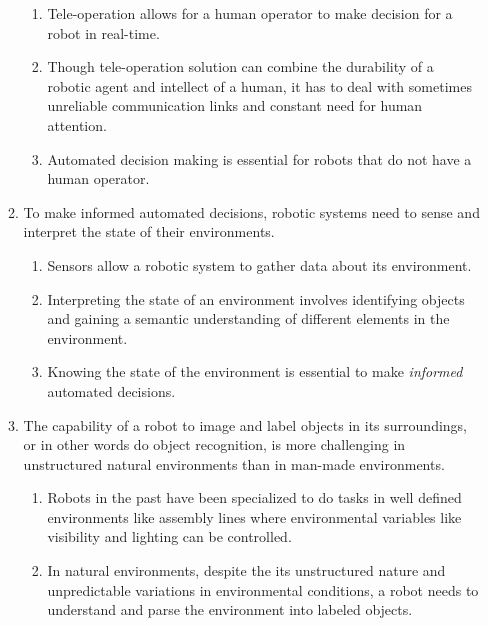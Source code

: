 \documentclass {udthesis}
\begin{document}
\begin{enumerate}[label=Chapter \arabic*:]
\begin{enumerate}[label=Section \arabic*:, start=0]
\begin{enumerate}[label=Para \arabic*:, start=1]
      \item Tele-operation allows for a human operator to make decision for a robot in real-time.
      
      \item Though tele-operation solution can combine the durability of a robotic agent and intellect of a human, it has to deal with sometimes unreliable communication links and constant need for human attention.

      \item Automated decision making is essential for robots that do not have a human operator.
	\end{enumerate}
	    
  \item To make informed automated decisions, robotic systems need to sense and interpret the state of their environments.

    \begin{enumerate}[label=Para \arabic*:, start=1]

      \item Sensors allow a robotic system to gather data about its environment.
      
      \item Interpreting the state of an environment involves identifying objects and gaining a semantic understanding of different elements in the environment.
            
      \item Knowing the state of the environment is essential to make \emph{informed} automated decisions.
      
    \end{enumerate}
                    
  \item The capability of a robot to image and label objects in its surroundings, or in other words do object recognition, is more challenging in unstructured natural environments than in man-made environments.
  
    \begin{enumerate}[label=Para \arabic*:, start=1]
      \item Robots in the past have been specialized to do tasks in well defined environments like assembly lines  where environmental variables like visibility and lighting can be controlled.      
      
      \item In natural environments, despite the its unstructured nature and unpredictable variations in environmental conditions, a robot needs to understand and parse the environment into labeled objects.
      

\end{enumerate}
\end{enumerate}
\end{enumerate}
\end{document}

